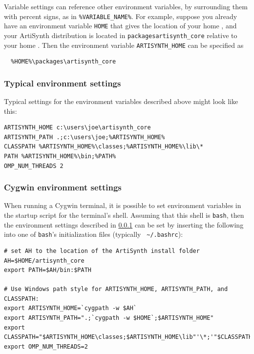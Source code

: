 Variable settings can reference other environment variables, by
surrounding them with percent signs, as in {\tt \%VARIABLE\_NAME\%}.  For
example, suppose you already have an environment variable {\tt HOME} that
gives the location of your home \directory{}, and your ArtiSynth
distribution is located in {\tt packages\SEP artisynth\_core} relative to your
home \directory{}. Then the environment variable {\tt ARTISYNTH\_HOME} can be
specified as

\begin{verbatim}
  %HOME%\packages\artisynth_core
\end{verbatim}

\subsubsection{Typical environment settings}
\label{TypicalEnvironment}

Typical settings for the environment variables described above might
look like this:

\begin{lstlisting}[]
ARTISYNTH_HOME c:\users\joe\artisynth_core
ARTISYNTH_PATH .;c:\users\joe;%ARTISYNTH_HOME%
CLASSPATH %ARTISYNTH_HOME%\classes;%ARTISYNTH_HOME%\lib\*
PATH %ARTISYNTH_HOME%\bin;%PATH%
OMP_NUM_THREADS 2
\end{lstlisting}

\subsubsection{Cygwin environment settings}
\label{CygwinEnvironmentSettings}

When running a Cygwin terminal, it is possible to set environment
variables in the startup script for the terminal's shell. Assuming
that this shell is {\tt bash}, then the environment settings described
in \ref{TypicalEnvironment} can be set by inserting the following
into one of {\tt bash}'s initialization files (typically {\tt
\textasciitilde/.bashrc}):

\begin{lstlisting}[]
# set AH to the location of the ArtiSynth install folder
AH=$HOME/artisynth_core
export PATH=$AH/bin:$PATH

# Use Windows path style for ARTISYNTH_HOME, ARTISYNTH_PATH, and CLASSPATH:
export ARTISYNTH_HOME=`cygpath -w $AH`
export ARTISYNTH_PATH=".;`cygpath -w $HOME`;$ARTISYNTH_HOME"
export CLASSPATH="$ARTISYNTH_HOME\classes;$ARTISYNTH_HOME\lib"'\*;'"$CLASSPATH"
export OMP_NUM_THREADS=2
\end{lstlisting}

